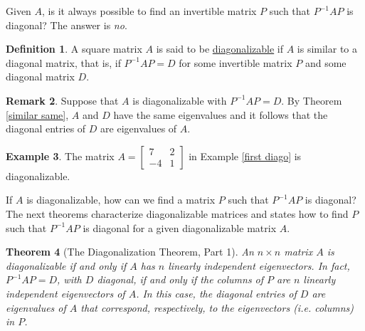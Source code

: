 \documentclass[12pt,letterpaper]{book}
\numberwithin{equation}{section}
\newtheorem{thm}{\textbf{Theorem}}[section]
\theoremstyle{definition}
\newtheorem{defi}[thm]{\textbf{Definition}}
\newtheorem{example}[thm]{\textbf{Example}}
\newtheorem{remark}[thm]{\textbf{Remark}}
\begin{document}
Given $A$, is it always possible to find an
invertible matrix $P$ such that $P^{-1}AP$ is diagonal? The answer is \textit{no}.

\begin{defi} A square matrix $A$ is said to be
\underline{diagonalizable} if $A$ is similar to a diagonal matrix,
that is, if $P^{-1}AP=D$ for some invertible matrix $P$ and some diagonal matrix $D$.
\end{defi}

\begin{remark}
Suppose that $A$ is diagonalizable with $P^{-1}AP=D$. By Theorem \ref{similar same}, $A$ and $D$ have the same eigenvalues and it follows that the diagonal entries of $D$ are eigenvalues of $A$.
\end{remark}

\begin{example} The matrix $A=\left[\begin{array}{rr} 7 & 2 \\ -4 &
1 \end{array}\right]$ in Example \ref{first diago} is diagonalizable.
\end{example}

If $A$ is diagonalizable, how can we find a
matrix $P$ such that $P^{-1}AP$ is diagonal? The next theorems characterize diagonalizable matrices and states how to find $P$ such that $P^{-1}AP$ is diagonal for a given diagonalizable matrix $A$.

\begin{thm}[The Diagonalization Theorem, Part 1]An $n\times n$ matrix
$A$ is diagonalizable if and only if $A$ has $n$ linearly
independent eigenvectors. In fact, $P^{-1}AP=D$, with $D$ diagonal,
if and only if the columns of $P$ are $n$ linearly independent
eigenvectors of $A$. In this case, the diagonal entries of $D$ are
eigenvalues of $A$ that correspond, respectively, to the
eigenvectors (i.e. columns) in $P$.
\end{thm}
\end{document}
